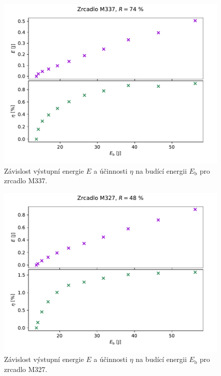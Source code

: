 \begin{figure}[H] 
	\centering
	\includegraphics[scale = 0.7]{img/zrcadlo_M337.pdf} 
	\caption{Závislost výstupní energie $E$ a účinnosti $\eta$ na budící energii $E_\mathrm{b}$ pro zrcadlo M337.} 
	\label{fig:ucinnost_M337}
\end{figure}


\begin{figure}[H] 
	\centering
	\includegraphics[scale = 0.7]{img/zrcadlo_M327.pdf} 
	\caption{Závislost výstupní energie $E$ a účinnosti $\eta$ na budící energii $E_\mathrm{b}$ pro zrcadlo M327.} 
	\label{fig:ucinnost_M327}
\end{figure}


